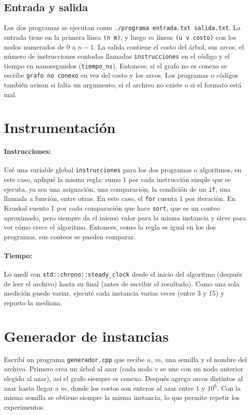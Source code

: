 \documentclass[11pt,a4paper]{article}
\begin{document}
\subsection{Entrada y salida}
Los dos programas se ejecutan como \texttt{./programa entrada.txt salida.txt}. La entrada tiene en la primera línea \texttt{(n m)}, y luego $m$ líneas \texttt{(u v costo)} con los nodos numerados de $0$ a $n-1$. La salida contiene el costo del árbol, sus arcos, el número de instrucciones contadas llamadas \texttt{instrucciones} en el código y el tiempo en nanosegundos (\texttt{tiempo\_ns}). Entonces, si el grafo no es conexo se escribe \texttt{grafo no conexo} en vez del costo y los arcos. Los programas o códigos también avisan si falta un argumento, si el archivo no existe o si el formato está mal.

\section{Instrumentación}
\paragraph{Instrucciones:} Usé una variable global \texttt{instrucciones} para los dos programas o algoritmos, en este caso, apliqué la misma regla: sumo 1 por cada instrucción simple que se ejecuta, ya sea una asignación, una comparación, la condición de un \texttt{if}, una llamada a función, entre otras. En este caso, el \texttt{for} cuenta 1 por iteración. En Kruskal cuento 1 por cada comparación que hace \texttt{sort}, que es un conteo aproximado, pero siempre da el mismo valor para la misma instancia y sirve para ver cómo crece el algoritmo. Entonces, como la regla es igual en los dos programas, sus conteos se pueden comparar.

\paragraph{Tiempo:} Lo medí con \texttt{std::chrono::steady\_clock} desde el inicio del algoritmo (después de leer el archivo) hasta su final (antes de escribir el resultado). Como una sola medición puede variar, ejecuté cada instancia varias veces (entre 3 y 15) y reporto la mediana.

\section{Generador de instancias}
Escribí un programa \texttt{generador.cpp} que recibe $n$, $m$, una semilla y el nombre del archivo. Primero crea un árbol al azar (cada nodo $v$ se une con un nodo anterior elegido al azar), así el grafo siempre es conexo. Después agrega arcos distintos al azar hasta llegar a $m$, donde los costos son enteros al azar entre $1$ y $10^6$. Con la misma semilla se obtiene siempre la misma instancia, lo que permite repetir los experimentos.
\end{document}
